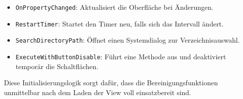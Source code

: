 \begin{itemize}
  \item \texttt{OnPropertyChanged}: Aktualisiert die Oberfläche bei Änderungen.
  \item \texttt{RestartTimer}: Startet den Timer neu, falls sich das Intervall ändert.
  \item \texttt{SearchDirectoryPath}: Öffnet einen Systemdialog zur Verzeichnisauswahl.
  \item \texttt{ExecuteWithButtonDisable}: Führt eine Methode aus und deaktiviert temporär die Schaltflächen.
\end{itemize}

Diese Initialisierungslogik sorgt dafür, dass die Bereinigungsfunktionen unmittelbar nach dem Laden der View voll einsatzbereit sind.